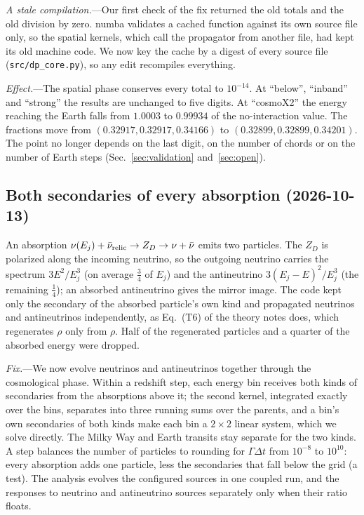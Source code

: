 \documentclass[11pt,a4paper]{article}
\newcommand{\file}[1]{\nolinkurl{#1}}
\begin{document}
\textit{A stale compilation.}---Our first check of the fix returned the old totals and the old
division by zero. numba validates a cached function against its own source file only, so the
spatial kernels, which call the propagator from another file, had kept its old machine code. We
now key the cache by a digest of every source file (\file{src/dp\_core.py}), so any edit
recompiles everything.

\textit{Effect.}---The spatial phase conserves every total to $10^{-14}$. At ``below'',
``inband'' and ``strong'' the results are unchanged to five digits. At ``cosmoX2'' the energy
reaching the Earth falls from $1.0003$ to $0.99934$ of the no-interaction value. The fractions
move from $(0.32917, 0.32917, 0.34166)$ to $(0.32899, 0.32899, 0.34201)$. The point no longer
depends on the last digit, on the number of chords or on the number of Earth steps
(Sec.~\ref{sec:validation} and~\ref{sec:open}).

\subsection{Both secondaries of every absorption (2026-10-13)}
\label{app:regeneration}

An absorption $\nu(E_j) + \bar\nu_{\rm relic} \to Z_D \to \nu + \bar\nu$ emits two particles. The
$Z_D$ is polarized along the incoming neutrino, so the outgoing neutrino carries the spectrum
$3E^2/E_j^3$ (on average $\tfrac34$ of $E_j$) and the antineutrino $3(E_j-E)^2/E_j^3$ (the
remaining $\tfrac14$); an absorbed antineutrino gives the mirror image. The code kept only the
secondary of the absorbed particle's own kind and propagated neutrinos and antineutrinos
independently, as Eq.~(T6) of the theory notes does, which regenerates $\rho$ only from $\rho$.
Half of the regenerated particles and a quarter of the absorbed energy were dropped.

\textit{Fix.}---We now evolve neutrinos and antineutrinos together through the cosmological
phase. Within a redshift step, each energy bin receives both kinds of secondaries from the
absorptions above it; the second kernel, integrated exactly over the bins, separates into three
running sums over the parents, and a bin's own secondaries of both kinds make each bin a $2\times2$
linear system, which we solve directly. The Milky Way and Earth transits stay separate for the
two kinds. A step balances the number of particles to rounding for $\Gamma\Delta t$ from
$10^{-8}$ to $10^{10}$: every absorption adds one particle, less the secondaries that fall below
the grid (a test). The analysis evolves the configured sources in one coupled run, and the
responses to neutrino and antineutrino sources separately only when their ratio floats.
\end{document}
